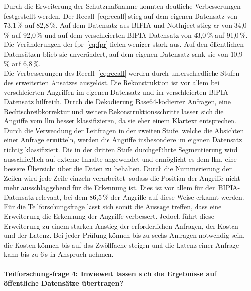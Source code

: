 Durch die Erweiterung der Schutzmaßnahme konnten deutliche Verbesserungen festgestellt werden. Der Recall~\eqref{eq:recall} stieg auf dem eigenen Datensatz von 73,1\,\% auf 82,8\,\%.
Auf dem Datensatz aus BIPIA und NotInject stieg er von 34,0\,\% auf 92,0\,\% und auf dem verschleierten BIPIA-Datensatz von 43,0\,\% auf 91,0\,\%. Die Veränderungen
der \ac{fpr}~\eqref{eq:fpr} fielen weniger stark aus. Auf den öffentlichen Datensätzen blieb sie unverändert, auf dem eigenen Datensatz sank sie von 10,9\,\% auf 6,8\,\%. \\
Die Verbesserungen des Recall~\eqref{eq:recall} werden durch unterschiedliche Stufen des erweiterten Ansatzes ausgelöst. Die Rekonstruktion ist vor allem bei verschleierten
Angriffen im eigenen Datensatz und im verschleierten BIPIA-Datensatz hilfreich. Durch die Dekodierung Base64-kodierter Anfragen, eine Rechtschreibkorrektur und
weitere Rekonstruktionsschritte lassen sich die Angriffe vom \ac{llm} besser klassifizieren, da sie eher einem Klartext entsprechen. \\
Durch die Verwendung der Leitfragen in der zweiten Stufe, welche die Absichten einer Anfrage ermitteln, werden die Angriffe insbesondere im eigenen Datensatz richtig
klassifiziert. Die in der dritten Stufe durchgeführte Segmentierung wird ausschließlich auf externe Inhalte angewendet und ermöglicht es dem \ac{llm}, eine bessere
Übersicht über die Daten zu behalten. Durch die Nummerierung der Zeilen wird jede Zeile einzeln verarbeitet, sodass die Position der Angriffe nicht mehr ausschlaggebend 
für die Erkennung ist. Dies ist vor allem für den BIPIA-Datensatz relevant, bei dem 86,5\,\% der Angriffe auf diese Weise erkannt
werden. \\
Für die Teilforschungsfrage lässt sich somit die Aussage treffen, dass eine Erweiterung die Erkennung der Angriffe verbessert. Jedoch führt diese Erweiterung zu
einem starken Anstieg der erforderlichen Anfragen, der Kosten und der Latenz. Bei jeder Prüfung können bis zu sechs Anfragen notwendig sein, die Kosten können bis
auf das Zwölffache steigen und die Latenz einer Anfrage kann bis zu 6\,s in Anspruch nehmen.

\paragraph{Teilforschungsfrage 4: Inwieweit lassen sich die Ergebnisse auf öffentliche Datensätze übertragen?}

